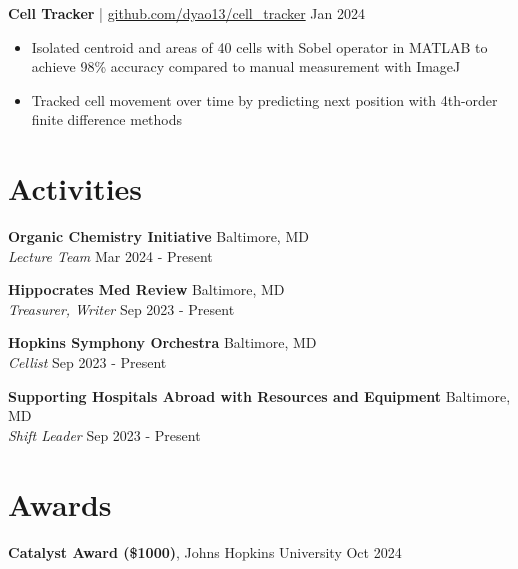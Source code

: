 \documentclass[11pt]{article}       %
\begin{document}
\textbf{Cell Tracker} | \href{https://github.com/dyao13/cell_tracker}{github.com/dyao13/cell\_tracker} \hfill Jan 2024 \vspace{-9pt} \\
\begin{itemize}
  \item Isolated centroid and areas of 40 cells with Sobel operator in MATLAB to achieve 98\% accuracy compared to manual measurement with ImageJ
  \item Tracked cell movement over time by predicting next position with 4th-order finite difference methods
\end{itemize}

\vspace{-18.5pt}

\section*{Activities}
\textbf{Organic Chemistry Initiative} \hfill Baltimore, MD \\
\textit{Lecture Team} \hfill Mar 2024 - Present \\

\vspace{5pt}

\textbf{Hippocrates Med Review} \hfill Baltimore, MD \\
\textit{Treasurer, Writer} \hfill Sep 2023 - Present \\

\vspace{5pt}

\textbf{Hopkins Symphony Orchestra} \hfill Baltimore, MD \\
\textit{Cellist} \hfill Sep 2023 - Present \\

\vspace{5pt}

\textbf{Supporting Hospitals Abroad with Resources and Equipment} \hfill Baltimore, MD \\
\textit{Shift Leader} \hfill Sep 2023 - Present \\

\vspace{-9pt}

\section*{Awards}
\textbf{Catalyst Award (\$1000)}, Johns Hopkins University \hfill Oct 2024 \\
\end{document}
